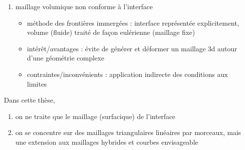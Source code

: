 \begin{enumerate}
	\item maillage volumique non conforme à l’interface
	\begin{itemize}
		\item méthode des frontières immergées \cite{peskin2002, hovnanian2012, wang2012} : interface représentée explicitement, volume (fluide) traité de façon eulérienne (\ie maillage fixe)
		\item intérêt/avantages : évite de générer et déformer un maillage 3d autour d’une géométrie complexe
		\item contraintes/inconvénients : application indirecte des conditions aux limites
	\end{itemize}
\end{enumerate}

Dans cette thèse,
\begin{enumerate}
	\item on ne traite que le maillage (surfacique) de l'interface
	\item on se concentre sur des maillages triangulaires linéaires par morceaux, mais une extension aux maillages hybrides et courbes envisageable
\end{enumerate}






